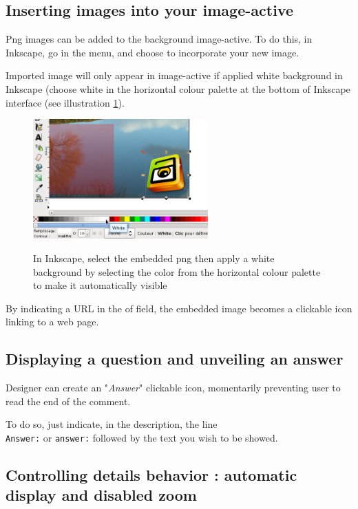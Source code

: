 \subsection{Inserting images into your image-active}\label{insertion_images}

Png images can be added to the background image-active. To do this, in 
Inkscape, go in the  menu, and choose  
to incorporate your new image.

Imported image will only appear in image-active if applied white background in 
Inkscape (choose white in the horizontal colour palette at the bottom of 
Inkscape interface (see illustration 
\ref{remplissage_blanc}).

\begin{figure}[htp]
 \centering
 \caption{In Inkscape, select the embedded png then apply a white background 
 by selecting the color from the horizontal colour palette to make it 
 automatically visible} \includegraphics[width=0.6\textwidth]
 {images/remplissage_blanc}
 \label{remplissage_blanc}
\end{figure}

By indicating a URL in the  of  field, 
the embedded image becomes a clickable icon linking to a web page.

\subsection{Displaying a question and unveiling an answer}

Designer can create an "\textit{Answer}" clickable icon, momentarily 
preventing user to read the end of the comment.

To do so, just indicate, in the description, the line\\ \verb|Answer:| or 
\verb|answer:| followed by the text you wish to be showed.

\subsection{Controlling details behavior : automatic display and disabled zoom}
\label{couche_XML}


